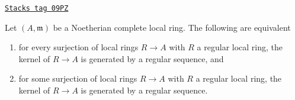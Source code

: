 \begin{lemma}
\label{dpa-lemma-ci-well-defined}
\href{https://stacks.math.columbia.edu/tag/09PZ}{\texttt{Stacks tag 09PZ}}

Let $(A, \mathfrak m)$ be a Noetherian complete local ring.
The following are equivalent
\begin{enumerate}
\item for every surjection of local rings $R \to A$ with $R$
a regular local ring, the kernel of $R \to A$ is generated
by a regular sequence, and
\item for some surjection of local rings $R \to A$ with $R$
a regular local ring, the kernel of $R \to A$ is generated
by a regular sequence.
\end{enumerate}
\end{lemma}

